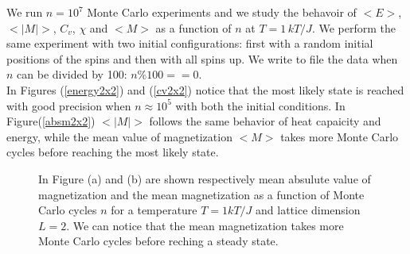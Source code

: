 \documentclass[%
preprint,
 amsmath,amssymb,
 aps,
]{revtex4-1}
\theoremstyle{plain}
\theoremstyle{definition}
\theoremstyle{plain}
\begin{document}
We run $n=10^7$ Monte Carlo experiments and we study the behavoir of $<E>$, $<|M|>$, $C_v$, $\chi$ and $<M>$ as a function of $n$ at $T=1 \, kT/J$. We perform the same experiment with two initial configurations: first with a random initial positions of the spins and then with all spins up. We write to file the data when $n$ can be divided by 100: $n\%100==0$.\\
In Figures (\ref{energy2x2}) and (\ref{cv2x2}) notice that the most likely state is reached with good precision when $n \approx 10^{5}$ with both the initial conditions.
In Figure(\ref{absm2x2}) $<|M|>$ follows the same behavior of heat capaicity and energy, while the mean value of magnetization $<M>$ takes more Monte Carlo cycles before reaching the most likely state. 
\begin{figure}[h!]
\centering
\caption{In Figure (a) and (b) are shown respectively mean absulute value of magnetization and the mean magnetization as a function of Monte Carlo cycles $n$ for a temperature $T=1 kT/J$ and lattice dimension $L=2$. We can notice that the mean magnetization takes more Monte Carlo cycles before reching a steady state.}
\end{figure}
\end{document}
